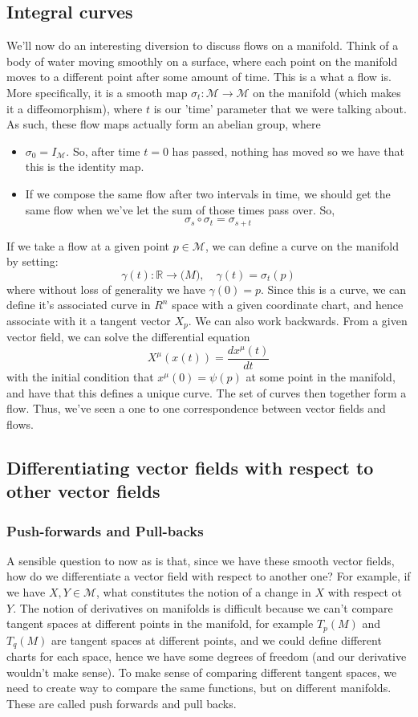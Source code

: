 \documentclass[11pt, a4paper]{article}   	%
\theoremstyle{slplain}
\begin{document}
\subsection{Integral curves} 
We'll now do an interesting diversion to discuss flows on a manifold. Think of a body of water moving smoothly on a surface, where each point on the manifold moves to a different point after some amount of time. This is a what a flow is. More specifically, it is a smooth map $\sigma_t : \mathcal{M} \rightarrow \mathcal{M} $ on the manifold (which makes it a diffeomorphism), where $t$ is our 'time' parameter that we were talking about. As such, these flow maps actually form an abelian group, where 
\begin{itemize} 
\item $\sigma_0 = I_\mathcal{M} $. So, after time $t = 0$ has passed, nothing has moved so we have that this is the identity map. 
\item If we compose the same flow after two intervals in time, we should get the same flow when we've let the sum of those times pass over. So, 
\[ \sigma_s \circ \sigma_t  = \sigma_{ s + t } \] 
\end{itemize} 
If we take a flow at a given point $p \in \mathcal{M}$, we can define a curve on the manifold by setting: 
\[ 
\gamma(t): \mathbb{R} \rightarrow \mathcal(M), \quad \gamma(t) = \sigma_t ( p ) 
\] where without loss of generality we have $\gamma(0) = p$. Since this is a curve, we can define it's associated curve in $R^n$ space with a given coordinate chart, and hence associate with it a tangent vector $X_p$. We can also work backwards. From a given vector field, we can solve the differential equation 
\[ 	
X^\mu ( x(t) )  = \frac{ d x^\mu ( t) }{ dt} 
\] with the initial condition that $x^\mu ( 0 )  = \psi ( p ) $ at some point in the manifold, and have that this defines a unique curve. The set of curves then together form a flow. 
Thus, we've seen a one to one correspondence between vector fields and flows. 	
\pagebreak 

\subsection{Differentiating vector fields with respect to other vector fields}

\subsubsection{Push-forwards and Pull-backs} 
A sensible question to now as is that, since we have these smooth vector fields, how do we differentiate a vector field with respect to another one? For example, if we have $X, Y \in \mathcal{M}$, what constitutes the notion of a change in $X$ with respect ot $Y$. The notion of derivatives on manifolds is difficult because we can't compare tangent spaces at different points in the manifold, for example $T_p(M )$ and $T_q(M) $ are tangent spaces at different points, and we could define different charts for each space, hence we have some degrees of freedom (and our derivative  wouldn't make sense).  To make sense of comparing different tangent spaces, we need to create way to compare the same functions, but on different manifolds. These are called push forwards and pull backs. 
\end{document}
